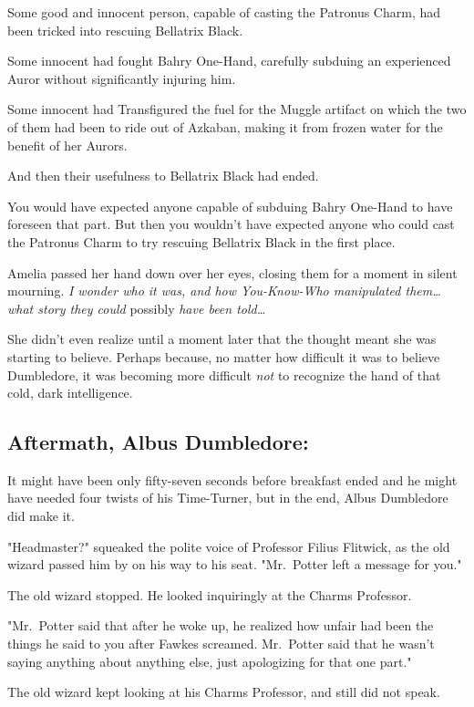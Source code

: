 Some good and innocent person, capable of casting the Patronus Charm, had been 
tricked into rescuing Bellatrix Black.

Some innocent had fought Bahry One-Hand, carefully subduing an experienced 
Auror without significantly injuring him.

Some innocent had Transfigured the fuel for the Muggle artifact on which the 
two of them had been to ride out of Azkaban, making it from frozen water for 
the benefit of her Aurors.

And then their usefulness to Bellatrix Black had ended.

You would have expected anyone capable of subduing Bahry One-Hand to have 
foreseen that part. But then you wouldn't have expected anyone who could cast 
the Patronus Charm to try rescuing Bellatrix Black in the first place.

Amelia passed her hand down over her eyes, closing them for a moment in silent 
mourning. \emph{I wonder who it was, and how You-Know-Who manipulated 
them{\ldots} what story they could} possibly\emph{ have been told{\ldots}}

She didn't even realize until a moment later that the thought meant she was 
starting to believe. Perhaps because, no matter how difficult it was to believe 
Dumbledore, it was becoming more difficult \emph{not} to recognize the hand of 
that cold, dark intelligence.
\sbreak
\subsection{Aftermath, Albus Dumbledore:}

It might have been only fifty-seven seconds before breakfast ended and he might 
have needed four twists of his Time-Turner, but in the end, Albus Dumbledore 
did make it.

"Headmaster?" squeaked the polite voice of Professor Filius Flitwick, as the 
old wizard passed him by on his way to his seat. "Mr.~Potter left a message for 
you."

The old wizard stopped. He looked inquiringly at the Charms Professor.

"Mr.~Potter said that after he woke up, he realized how unfair had been the 
things he said to you after Fawkes screamed. Mr.~Potter said that he wasn't 
saying anything about anything else, just apologizing for that one part."

The old wizard kept looking at his Charms Professor, and still did not speak.

